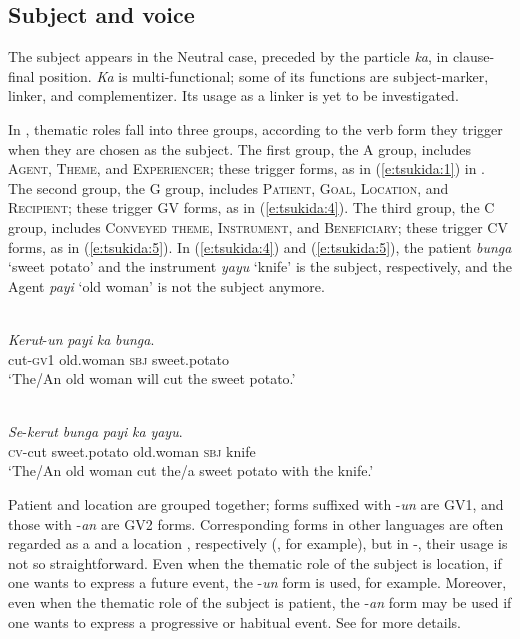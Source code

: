 \documentclass[output=paper
,modfonts
,nonflat]{langsci/langscibook}
\begin{document}
\subsection{\label{s:tsukida:1.2}Subject and voice}

The subject appears in the Neutral case, preceded by the particle \textit{ka}, in clause-final position. \textit{Ka} is multi-functional; some of its functions are subject-marker, linker, and complementizer. Its usage as a linker is yet to be investigated. 

In , thematic roles fall into three groups, according to the verb form they trigger when they are chosen as the subject. The first group, the A group, includes \textsc{Agent}, \textsc{Theme}, and \textsc{Experiencer}; these trigger  forms, as in (\ref{e:tsukida:1}) in . The second group, the G group, includes \textsc{Patient}, \textsc{Goal}, \textsc{Location}, and \textsc{Recipient}; these trigger GV forms, as in (\ref{e:tsukida:4}). The third group, the C group, includes \textsc{Conveyed theme}, \textsc{Instrument}, and \textsc{Beneficiary}; these trigger CV forms, as in (\ref{e:tsukida:5}). In (\ref{e:tsukida:4}) and (\ref{e:tsukida:5}), the patient \textit{bunga} ‘sweet potato’ and the instrument \textit{yayu} ‘knife’ is the subject, respectively, and the Agent \textit{payi} ‘old woman’ is not the subject anymore.

\begin{exe}
	\label{e:tsukida:4}\\
	\gll \textit{Kerut}-\textit{un} \textit{payi} \textit{ka} \textit{bunga}.\\
	cut-\textsc{gv1} old.woman \textsc{sbj} sweet.potato\\
	\glt ‘The/An old woman will cut the sweet potato.’
\end{exe}

\begin{exe}
	\label{e:tsukida:5}\\
	\gll \textit{Se}-\textit{kerut} \textit{bunga} \textit{payi} \textit{ka} \textit{yayu}.\\
	\textsc{cv}-cut sweet.potato old.woman \textsc{sbj} knife\\
	\glt ‘The/An old woman cut the/a sweet potato with the knife.’
\end{exe}

\noindent
Patient and location are grouped together; forms suffixed with -\textit{un} are GV1, and those with -\textit{an} are GV2 forms. Corresponding forms in other languages are often regarded as a  and a location , respectively (\citealt[78]{Huang2016Ata}, for example), but in -, their usage is not so straightforward. Even when the thematic role of the subject is location, if one wants to express a future event, the -\textit{un} form is used, for example. Moreover, even when the thematic role of the subject is patient, the -\textit{an} form may be used if one wants to express a progressive or habitual event. See \citet{Tsukida2012} for more details. 
\end{document}
